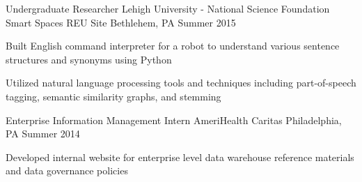 \begin{cventries}
  \cventry
    {Undergraduate Researcher} %
    {Lehigh University - National Science Foundation Smart Spaces REU Site} %
    {Bethlehem, PA} %
    {Summer 2015} %
    {
      \begin{cvitems} %
        \item {Built English command interpreter for a robot to understand various sentence structures and synonyms using Python}
        \item {Utilized natural language processing tools and techniques including part-of-speech tagging, semantic similarity graphs, and stemming}
      \end{cvitems}
    }

  \cventry
    {Enterprise Information Management Intern} %
    {AmeriHealth Caritas} %
    {Philadelphia, PA} %
    {Summer 2014} %
    {
      \begin{cvitems} %
        \item {Developed internal website for enterprise level data warehouse reference materials and data governance policies}
      \end{cvitems}
    }
\end{cventries}

